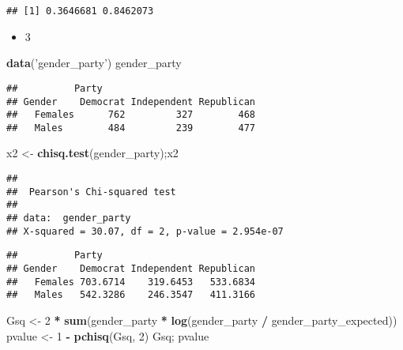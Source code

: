 \documentclass[12pt,hyperref,]{ctexart}
\newenvironment{Shaded}{\begin{snugshade}}{\end{snugshade}}
\newcommand{\CommentTok}[1]{\textcolor[rgb]{0.56,0.35,0.01}{\textit{#1}}}
\newcommand{\DecValTok}[1]{\textcolor[rgb]{0.00,0.00,0.81}{#1}}
\newcommand{\KeywordTok}[1]{\textcolor[rgb]{0.13,0.29,0.53}{\textbf{#1}}}
\newcommand{\NormalTok}[1]{#1}
\newcommand{\OperatorTok}[1]{\textcolor[rgb]{0.81,0.36,0.00}{\textbf{#1}}}
\newcommand{\StringTok}[1]{\textcolor[rgb]{0.31,0.60,0.02}{#1}}
\providecommand{\tightlist}{%
  \setlength{\itemsep}{0pt}\setlength{\parskip}{0pt}}
\begin{document}
\begin{verbatim}
## [1] 0.3646681 0.8462073
\end{verbatim}

\begin{itemize}
\tightlist
\item
  3
\end{itemize}

\begin{Shaded}
\begin{Highlighting}[]
\KeywordTok{data}\NormalTok{(}\StringTok{'gender_party'}\NormalTok{)}
\NormalTok{gender_party}
\end{Highlighting}
\end{Shaded}

\begin{verbatim}
##          Party
## Gender    Democrat Independent Republican
##   Females      762         327        468
##   Males        484         239        477
\end{verbatim}

\begin{Shaded}
\begin{Highlighting}[]
\NormalTok{x2 <-}\StringTok{ }\KeywordTok{chisq.test}\NormalTok{(gender_party);x2}
\end{Highlighting}
\end{Shaded}

\begin{verbatim}
## 
##  Pearson's Chi-squared test
## 
## data:  gender_party
## X-squared = 30.07, df = 2, p-value = 2.954e-07
\end{verbatim}

\begin{Shaded}
\end{Shaded}

\begin{verbatim}
##          Party
## Gender    Democrat Independent Republican
##   Females 703.6714    319.6453   533.6834
##   Males   542.3286    246.3547   411.3166
\end{verbatim}

\begin{Shaded}
\begin{Highlighting}[]
\NormalTok{Gsq <-}\StringTok{ }\DecValTok{2} \OperatorTok{*}\StringTok{ }\KeywordTok{sum}\NormalTok{(gender_party }\OperatorTok{*}\StringTok{ }\KeywordTok{log}\NormalTok{(gender_party }\OperatorTok{/}\StringTok{ }\NormalTok{gender_party_expected))}
\NormalTok{pvalue <-}\StringTok{ }\DecValTok{1} \OperatorTok{-}\StringTok{ }\KeywordTok{pchisq}\NormalTok{(Gsq, }\DecValTok{2}\NormalTok{)}
\NormalTok{Gsq; pvalue}
\end{Highlighting}
\end{Shaded}
\end{document}
